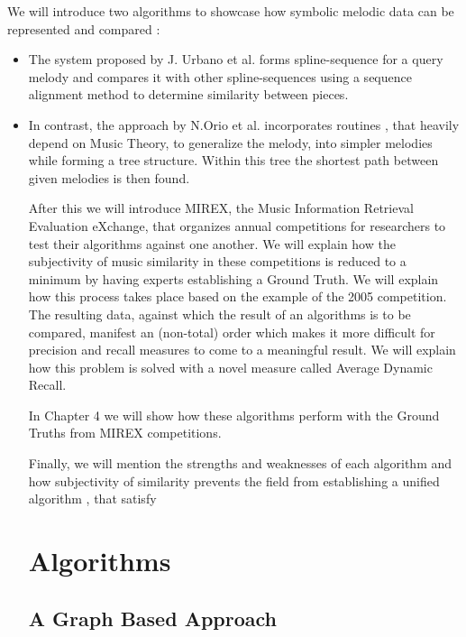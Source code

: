 \documentclass{llncs}
\begin{document}
		We will introduce two algorithms to showcase how symbolic melodic data can be represented and compared :
		\begin{itemize}
		\item The system proposed by J. Urbano et al. \cite{five_point_five} forms spline-sequence for a query melody and compares it with other spline-sequences using a sequence alignment method to determine similarity between pieces. 
		\item In contrast, the approach by N.Orio et al. \cite{two_point_four} incorporates routines , that heavily depend on Music Theory, to generalize the melody, into simpler melodies while forming a tree structure. Within this tree the shortest path between given melodies is then found.

        After this we will introduce MIREX, the Music Information Retrieval Evaluation eXchange, that organizes annual competitions for researchers to test their algorithms against one another. We will explain how the subjectivity of music similarity in these competitions is reduced to a minimum by having experts establishing a Ground Truth. We will explain how this process takes place based on the example of the 2005 competition. The resulting data, against which the result of an algorithms is to be compared, manifest an (non-total) order which makes it more difficult for precision and recall measures to come to a meaningful result. We will explain how this problem is solved with a novel measure called Average Dynamic Recall.

        In Chapter 4 we will show how these algorithms perform with the Ground Truths from MIREX competitions.

        Finally, we will mention the strengths and weaknesses of each algorithm and how subjectivity of similarity prevents the field from establishing a unified algorithm , that satisfy     
	

		 
		
	\section{Algorithms}

		\subsection{A Graph Based Approach}


\end{itemize}
\end{document}
